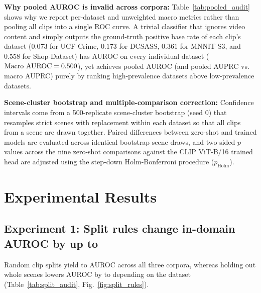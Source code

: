 \documentclass[pdflatex,sn-mathphys-num]{sn-jnl}
\begin{document}
\textbf{Why pooled AUROC is invalid across corpora:} Table~\ref{tab:pooled_audit} shows why we report per-dataset and unweighted macro metrics rather than pooling all \TotalClips{} clips into a single ROC curve. A trivial classifier that ignores video content and simply outputs the ground-truth positive base rate of each clip's dataset ($0.073$ for UCF-Crime, $0.173$ for DCSASS, $0.361$ for MNNIT-S3, and $0.558$ for Shop-Dataset) has \MacroAUROCID{} AUROC on every individual dataset ($\text{Macro AUROC} = 0.500{}$), yet achieves \PooledAUROCID{} pooled AUROC (and \PooledAUPRCID{} pooled AUPRC vs.\ \MacroAUPRCID{} macro AUPRC) purely by ranking high-prevalence datasets above low-prevalence datasets.

\TablePooledAudit

\textbf{Scene-cluster bootstrap and multiple-comparison correction:} Confidence intervals come from a 500-replicate scene-cluster bootstrap (seed 0) that resamples strict scenes with replacement within each dataset so that all clips from a scene are drawn together. Paired differences between zero-shot and trained models are evaluated across identical bootstrap scene draws, and two-sided $p$-values across the nine zero-shot comparisons against the CLIP ViT-B/16 trained head are adjusted using the step-down Holm-Bonferroni procedure ($p_{\text{Holm}}$).

\section{Experimental Results}\label{sec:results}

\subsection{Experiment 1: Split rules change in-domain AUROC by up to \DCSASSDrop{}}

Random clip splits yield \DCSASSRand{} to \ShopRand{} AUROC across all three corpora, whereas holding out whole scenes lowers AUROC by \MNNITDrop{} to \DCSASSDrop{} depending on the dataset (Table~\ref{tab:split_audit}, Fig.~\ref{fig:split_rules}).

\TableSplitAudit
\end{document}
